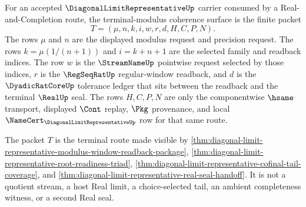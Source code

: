 \begin{definition}
\label{def:diagonal-limit-representative-terminal-modulus-coherence-surface}
For an accepted $\DiagonalLimitRepresentativeUp$ carrier consumed by a Real-and-Completion route, the terminal-modulus coherence surface is the finite packet
$$
T=(\mu,n,k,i,w,r,d,H,C,P,N).
$$
The rows $\mu$ and $n$ are the displayed modulus request and precision request. The rows $k=\mu(1/(n+1))$ and $i=k+n+1$ are the selected family and readback indices. The row $w$ is the $\StreamNameUp$ pointwise request selected by those indices, $r$ is the $\RegSeqRatUp$ regular-window readback, and $d$ is the $\DyadicRatCoreUp$ tolerance ledger that sits between the readback and the terminal $\RealUp$ seal. The rows $H,C,P,N$ are only the componentwise $\hsame$ transport, displayed $\Cont$ replay, $\Pkg$ provenance, and local $\NameCert_{\DiagonalLimitRepresentativeUp}$ row for that same route.

The packet $T$ is the terminal route made visible by \autoref{thm:diagonal-limit-representative-modulus-window-readback-package}, \autoref{thm:diagonal-limit-representative-root-readiness-triad}, \autoref{thm:diagonal-limit-representative-cofinal-tail-coverage}, and \autoref{thm:diagonal-limit-representative-real-seal-handoff}. It is not a quotient stream, a host Real limit, a choice-selected tail, an ambient completeness witness, or a second Real seal.
\end{definition}

